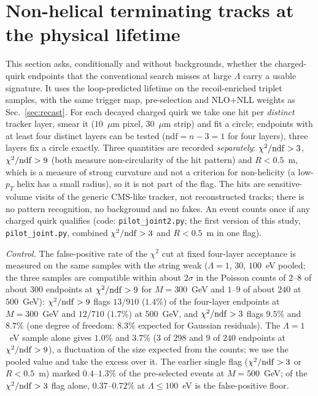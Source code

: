 \documentclass[prd,twocolumn,nofootinbib,superscriptaddress,amsmath,amssymb]{revtex4-2}
\begin{document}
\section{Non-helical terminating tracks at the physical lifetime}\label{sec:pilot}
This section asks, conditionally and without backgrounds, whether the charged-quirk endpoints that the conventional search misses at large $\Lambda$ carry a usable signature. It uses the loop-predicted lifetime on the recoil-enriched triplet samples, with the same trigger map, pre-selection and NLO+NLL weights as Sec.~\ref{sec:recast}. For each decayed charged quirk we take one hit per \emph{distinct} tracker layer, smear it ($10$~$\mu$m pixel, $30$~$\mu$m strip) and fit a circle; endpoints with at least four distinct layers can be tested ($\mathrm{ndf}=n-3=1$ for four layers), three layers fix a circle exactly. Three quantities are recorded \emph{separately}: $\chi^2/{\rm ndf}>3$, $\chi^2/{\rm ndf}>9$ (both measure non-circularity of the hit pattern) and $R<0.5$~m, which is a measure of strong curvature and not a criterion for non-helicity (a low-$p_T$ helix has a small radius), so it is not part of the flag. The hits are sensitive-volume visits of the generic CMS-like tracker, not reconstructed tracks; there is no pattern recognition, no background and no fakes. An event counts once if any charged quirk qualifies (code: \texttt{pilot\_joint2.py}; the first version of this study, \texttt{pilot\_joint.py}, combined $\chi^2/{\rm ndf}>3$ and $R<0.5$~m in one flag).

\emph{Control.} The false-positive rate of the $\chi^2$ cut at fixed four-layer acceptance is measured on the same samples with the string weak ($\Lambda=1$, $30$, $100$~eV pooled; the three samples are compatible within about $2\sigma$ in the Poisson counts of $2$--$8$ of about $300$ endpoints at $\chi^2/{\rm ndf}>9$ for $M=300$~GeV and $1$--$9$ of about $240$ at $500$~GeV): $\chi^2/{\rm ndf}>9$ flags $13/910$ ($1.4\%$) of the four-layer endpoints at $M=300$~GeV and $12/710$ ($1.7\%$) at $500$~GeV, and $\chi^2/{\rm ndf}>3$ flags $9.5\%$ and $8.7\%$ (one degree of freedom: $8.3\%$ expected for Gaussian residuals). The $\Lambda=1$~eV sample alone gives $1.0\%$ and $3.7\%$ ($3$ of $298$ and $9$ of $240$ endpoints at $\chi^2/{\rm ndf}>9$), a fluctuation of the size expected from the counts; we use the pooled value and take the excess over it. The earlier single flag ($\chi^2/{\rm ndf}>3$ or $R<0.5$~m) marked $0.4$--$1.3\%$ of the pre-selected events at $M=500$~GeV; of the $\chi^2/{\rm ndf}>3$ flag alone, $0.37$--$0.72\%$ at $\Lambda\le100$~eV is the false-positive floor.
\end{document}

